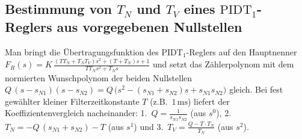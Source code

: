 \documentclass[a4paper,10pt,department=FakEI]{OTHRartcl}
\begin{document}
\subsection{Bestimmung von \texorpdfstring{$T_N$ und $T_V$}{TN und TV} eines \texorpdfstring{$\text{PIDT}_1$}{PIDT1}-Reglers aus vorgegebenen Nullstellen}
\footnotesize
Man bringt die Übertragungsfunktion des $\text{PIDT}_1$-Reglers auf den Hauptnenner $F_R(s) = K\,\frac{(T T_N + T_N T_V)s^2 + (T + T_N)s + 1}{T T_N s^2 + T_N s}$ und setzt das Zählerpolynom mit dem normierten Wunschpolynom der beiden Nullstellen $Q\,(s - s_{N1})(s - s_{N2}) = Q\,\big(s^2 - (s_{N1}+s_{N2})s + s_{N1} s_{N2}\big)$ gleich. Bei fest gewählter kleiner Filterzeitkonstante $T$ (z.B.\ $1\,\text{ms}$) liefert der Koeffizientenvergleich nacheinander: 1.~$Q = \frac{1}{s_{N1} s_{N2}}$ (aus $s^0$), 2.~$T_N = -Q\,(s_{N1}+s_{N2}) - T$ (aus $s^1$) und 3.~$T_V = \frac{Q - T\cdot T_N}{T_N}$ (aus $s^2$).

\label{doc:lastpage}
\end{document}
